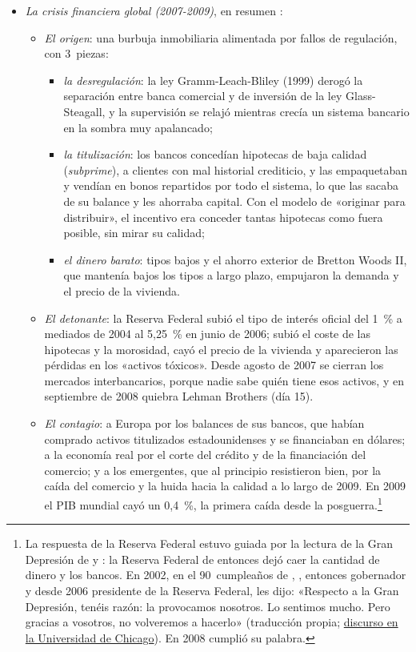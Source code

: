\documentclass[11pt]{article}
\begin{document}
\begin{itemize}
\item \emph{La crisis financiera global (2007-2009)}, en resumen :
  \begin{itemize}
  \item \emph{El origen}: una burbuja inmobiliaria alimentada por fallos de regulación, con 3~piezas:
    \begin{itemize}
    \item \emph{la desregulación}: la ley Gramm-Leach-Bliley (1999) derogó la separación entre banca comercial y de inversión de la ley Glass-Steagall, y la supervisión se relajó mientras crecía un sistema bancario en la sombra muy apalancado;
    \item \emph{la titulización}: los bancos concedían hipotecas de baja calidad (\emph{subprime}), a clientes con mal historial crediticio, y las empaquetaban y vendían en bonos repartidos por todo el sistema, lo que las sacaba de su balance y les ahorraba capital. Con el modelo de «originar para distribuir», el incentivo era conceder tantas hipotecas como fuera posible, sin mirar su calidad;
    \item \emph{el dinero barato}: tipos bajos y el ahorro exterior de Bretton Woods II, que mantenía bajos los tipos a largo plazo, empujaron la demanda y el precio de la vivienda.
    \end{itemize}
  \item \emph{El detonante}: la Reserva Federal subió el tipo de interés oficial del 1~\% a mediados de 2004 al 5,25~\% en junio de 2006; subió el coste de las hipotecas y la morosidad, cayó el precio de la vivienda y aparecieron las pérdidas en los «activos tóxicos». Desde agosto de 2007 se cierran los mercados interbancarios, porque nadie sabe quién tiene esos activos, y en septiembre de 2008 quiebra Lehman Brothers (día 15).
  \item \emph{El contagio}: a Europa por los balances de sus bancos, que habían comprado activos titulizados estadounidenses y se financiaban en dólares; a la economía real por el corte del crédito y de la financiación del comercio; y a los emergentes, que al principio resistieron bien, por la caída del comercio y la huida hacia la calidad a lo largo de 2009. En 2009 el PIB mundial cayó un 0,4~\%, la primera caída desde la posguerra\nocite{FMI2026WEOdatos}.\footnote{La respuesta de la Reserva Federal estuvo guiada por la lectura de la Gran Depresión de  y : la Reserva Federal de entonces dejó caer la cantidad de dinero y los bancos. En 2002, en el 90~cumpleaños de , , entonces gobernador y desde 2006 presidente de la Reserva Federal, les dijo: «Respecto a la Gran Depresión, tenéis razón: la provocamos nosotros. Lo sentimos mucho. Pero gracias a vosotros, no volveremos a hacerlo» (traducción propia; \href{https://www.federalreserve.gov/boarddocs/speeches/2002/20021108/}{discurso en la Universidad de Chicago}). En 2008 cumplió su palabra.}

\end{itemize}
\end{itemize}
\end{document}
